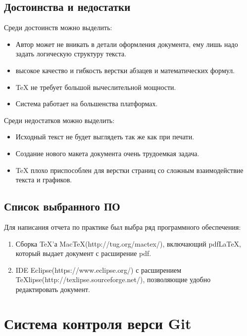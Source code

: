 \documentclass[14pt,a4paper]{article}
\begin{document}
\subsection{Достоинства и недостатки \cite{Lvovskii}}
Среди достоинств можно выделить:
\begin{itemize}
\item{}Автор может не вникать в детали оформления документа, ему лишь надо
задать логическую структуру текста.
\item{}высокое качество и гибкость верстки абзацев и математических формул.
\item{}\TeX{} не требует большой вычеслительной мощности.
\item{}Система работает на большенства платформах.
\end{itemize}
Среди недостатков можно выделить:
\begin{itemize}
\item{}Исходный текст не будет выглядеть так же как при печати.
\item{}Создание нового макета документа очень трудоемкая задача.
\item{}\TeX{} плохо приспособлен для верстки страниц со сложным взаимодействие текста
и графиков.
\end{itemize}

\subsection{Список выбранного ПО}
Для написания отчета по практике был выбра ряд программного обеспечения:
\begin{enumerate}
\item Сборка \TeX'а MacTeX(http://tug.org/mactex/), включающий pdfLaTeX, который
выдает документ с расширение pdf.
\item IDE Eclipse(https://www.eclipse.org/) с расширением
TeXlipse(http://texlipse.sourceforge.net/), позволяющие удобно редактировать
документ.
\end{enumerate}
\newpage
\section{Система контроля верси Git}
\end{document}
